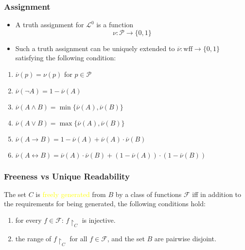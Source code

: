 \documentclass[UTF8,11pt,colorlinks,compress,openany]{beamer}%
\begin{document}
\begin{frame}\frametitle{Assignment}
	\begin{itemize}
		\item A truth assignment for $\mathscr{L}^0$ is a function
		\[\nu:\mathcal{P}\to\{0,1\}\]
		\item Such a truth assignment can be uniquely extended to $\overline{\nu}:\mathrm{wff}\to\{0,1\}$ satisfying the following condition:
	\end{itemize}
\begin{center}
	\begin{minipage}{.7\textwidth}
		\begin{enumerate}
			\item $\overline{\nu}(p)=\nu(p)$ for $p\in\mathcal{P}$
			\item $\overline{\nu}(\neg A)=1-\overline{\nu}(A)$
			\item $\overline{\nu}(A\wedge B)=\min\{\overline{\nu}(A),\overline{\nu}(B)\}$
			\item $\overline{\nu}(A\vee B)=\max\{\overline{\nu}(A),\overline{\nu}(B)\}$
			\item $\overline{\nu}(A\to B)=1-\overline{\nu}(A)+\overline{\nu}(A)\cdot\overline{\nu}(B)$
			\item $\overline{\nu}(A\leftrightarrow B)=\overline{\nu}(A)\cdot\overline{\nu}(B)+(1-\overline{\nu}(A))\cdot(1-\overline{\nu}(B))$
		\end{enumerate}		
	\end{minipage}
\end{center}
\end{frame}

\begin{frame}\frametitle{Freeness vs Unique Readability}
	\begin{definition}
		The set $C$ is \textcolor{yellow}{freely generated} from $B$ by a class of functions $\mathcal{F}$ iff in addition to the requirements for being generated, the following conditions hold:
		\begin{enumerate}
			\item for every $f\in\mathcal{F}$: $f{\restriction_C}$ is injective.
			\item the range of $f{\restriction_C}$ for all $f\in\mathcal{F}$, and the set $B$ are pairwise disjoint.
		\end{enumerate}
	\end{definition}
\end{frame}
\end{document}
